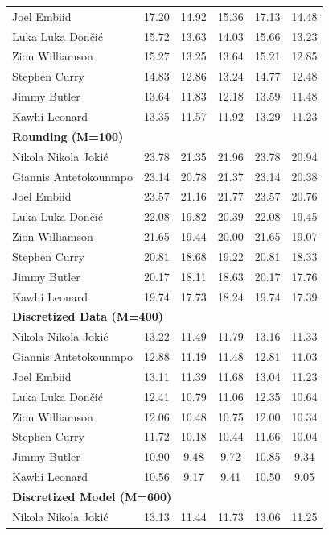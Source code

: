 \documentclass[11pt,a4paper]{article}
\begin{document}
\begin{table}[H]
\begin{tabular}{lccccc}
Joel Embiid & 17.20 & 14.92 & 15.36 & 17.13 & 14.48 \\
Luka Luka Don\v{c}i\'{c} & 15.72 & 13.63 & 14.03 & 15.66 & 13.23 \\
Zion Williamson & 15.27 & 13.25 & 13.64 & 15.21 & 12.85 \\
Stephen Curry & 14.83 & 12.86 & 13.24 & 14.77 & 12.48 \\
Jimmy Butler & 13.64 & 11.83 & 12.18 & 13.59 & 11.48 \\
Kawhi Leonard & 13.35 & 11.57 & 11.92 & 13.29 & 11.23 \\
\midrule
\multicolumn{6}{l}{\textbf{Rounding (M=100)}} \\
\midrule
Nikola Nikola Joki\'{c} & 23.78 & 21.35 & 21.96 & 23.78 & 20.94 \\
Giannis Antetokounmpo & 23.14 & 20.78 & 21.37 & 23.14 & 20.38 \\
Joel Embiid & 23.57 & 21.16 & 21.77 & 23.57 & 20.76 \\
Luka Luka Don\v{c}i\'{c} & 22.08 & 19.82 & 20.39 & 22.08 & 19.45 \\
Zion Williamson & 21.65 & 19.44 & 20.00 & 21.65 & 19.07 \\
Stephen Curry & 20.81 & 18.68 & 19.22 & 20.81 & 18.33 \\
Jimmy Butler & 20.17 & 18.11 & 18.63 & 20.17 & 17.76 \\
Kawhi Leonard & 19.74 & 17.73 & 18.24 & 19.74 & 17.39 \\
\midrule
\multicolumn{6}{l}{\textbf{Discretized Data (M=400)}} \\
\midrule
Nikola Nikola Joki\'{c} & 13.22 & 11.49 & 11.79 & 13.16 & 11.33 \\
Giannis Antetokounmpo & 12.88 & 11.19 & 11.48 & 12.81 & 11.03 \\
Joel Embiid & 13.11 & 11.39 & 11.68 & 13.04 & 11.23 \\
Luka Luka Don\v{c}i\'{c} & 12.41 & 10.79 & 11.06 & 12.35 & 10.64 \\
Zion Williamson & 12.06 & 10.48 & 10.75 & 12.00 & 10.34 \\
Stephen Curry & 11.72 & 10.18 & 10.44 & 11.66 & 10.04 \\
Jimmy Butler & 10.90 & 9.48 & 9.72 & 10.85 & 9.34 \\
Kawhi Leonard & 10.56 & 9.17 & 9.41 & 10.50 & 9.05 \\
\midrule
\multicolumn{6}{l}{\textbf{Discretized Model (M=600)}} \\
\midrule
Nikola Nikola Joki\'{c} & 13.13 & 11.44 & 11.73 & 13.06 & 11.25 \\

\end{tabular}
\end{table}
\end{document}
